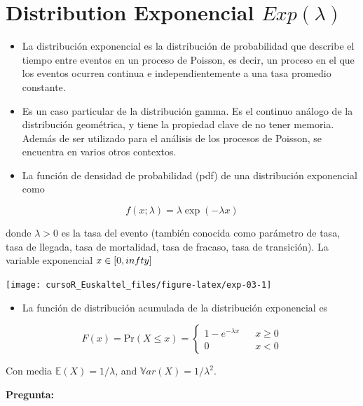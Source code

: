 \documentclass[]{book}
\providecommand{\tightlist}{%
  \setlength{\itemsep}{0pt}\setlength{\parskip}{0pt}}
\begin{document}
\section{\texorpdfstring{Distribution Exponencial
\(Exp(\lambda)\)}{Distribution Exponencial Exp(\textbackslash{}lambda)}}\label{distribution-exponencial-explambda}

\begin{itemize}
\item
  La distribución exponencial es la distribución de probabilidad que
  describe el tiempo entre eventos en un proceso de Poisson, es decir,
  un proceso en el que los eventos ocurren continua e independientemente
  a una tasa promedio constante.
\item
  Es un caso particular de la distribución gamma. Es el continuo análogo
  de la distribución geométrica, y tiene la propiedad clave de no tener
  memoria. Además de ser utilizado para el análisis de los procesos de
  Poisson, se encuentra en varios otros contextos.
\item
  La función de densidad de probabilidad (pdf) de una distribución
  exponencial como
\end{itemize}

\[
f(x;\lambda) =  \lambda \exp(-\lambda x)
\]

donde \(\lambda>0\) es la tasa del evento (también conocida como
parámetro de tasa, tasa de llegada, tasa de mortalidad, tasa de fracaso,
tasa de transición). La variable exponencial \(x \in[0,\\infty]\)

\begin{center}\texttt{[image: cursoR\_Euskaltel\_files/figure-latex/exp-03-1]} \end{center}

\begin{itemize}
\tightlist
\item
  La función de distribución acumulada de la distribución exponencial es
\end{itemize}

\[
F(x) = \mbox{Pr}(X\leq x) = 
  \left\{
    \begin{array}{lcc}
      1- e^{-\lambda x} & & x\geq 0 \\
      0                 & & x < 0
    \end{array}
  \right.
\]

Con media \(\mathbb{E}(X) = 1/\lambda\), and
\(\mathbb{V}ar(X) = 1/\lambda^2\).

\textbf{Pregunta:}
\end{document}
